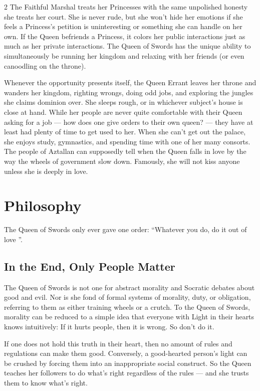 \begin{multicols}{2}
The Faithful Marshal treats her Princesses with the same unpolished honesty she treats her court. She is never rude, but she won't hide her emotions if she feels a Princess's petition is uninteresting or something she can handle on her own. If the Queen befriends a Princess, it colors her public interactions just as much as her private interactions. The Queen of Swords has the unique ability to simultaneously be running her kingdom and relaxing with her friends (or even canoodling on the throne).

Whenever the opportunity presents itself, the Queen Errant leaves her throne and wanders her kingdom, righting wrongs, doing odd jobs, and exploring the jungles she claims dominion over. She sleeps rough, or in whichever subject's house is close at hand. While her people are never quite comfortable with their Queen asking for a job — how does one give orders to their own queen? — they have at least had plenty of time to get used to her. When she can't get out the palace, she enjoys study, gymnastics, and spending time with one of her many consorts. The people of Aztallan can supposedly tell when the Queen falls in love by the way the wheels of government slow down. Famously, she will not kiss anyone unless she is deeply in love. 

\section*{Philosophy}

The Queen of Swords only ever gave one order: \textquotedblleft Whatever you do, do it out of love \textquotedblright. 

\subsection*{In the End, Only People Matter}

The Queen of Swords is not one for abstract morality and Socratic debates about good and evil. Nor is she fond of formal systems of morality, duty, or obligation, referring to them as either training wheels or a crutch. To the Queen of Swords, morality can be reduced to a simple idea that everyone with Light in their hearts knows intuitively: If it hurts people, then it is wrong. So don't do it. 

If one does not hold this truth in their heart, then no amount of rules and regulations can make them good. Conversely, a good-hearted person's light can be crushed by forcing them into an inappropriate social construct. So the Queen teaches her followers to do what's right regardless of the rules — and she trusts them to know what's right. 


\end{multicols}
